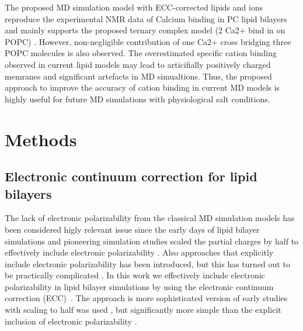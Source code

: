 \documentclass[aip,jcp,twocolumn]{revtex4}
\begin{document}

The proposed MD simulation model with ECC-corrected lipids and ions
reproduce the experimental NMR data of Calcium binding in PC lipid bilayers
and mainly supports the proposed ternary complex model (2 Ca2+ bind in
on POPC) \cite{akutsu81,altenbach84}. However, non-negligible contribution
of one Ca2+ cross bridging three POPC molecules is also observed.
The overestimated specific cation binding observed in current lipid models \cite{catte16}
may lead to articifially positively charged memranes and significant artefacts in
MD simualtions. Thus, the proposed approach to improve the accuracy of cation
binding in current MD models is highly useful for future MD simulations
with physiological salt conditions.




\section{Methods}

\subsection{Electronic continuum correction for lipid bilayers}
The lack of electronic polarizability from the classical MD simulation
models has been considered higly relevant issue since the early days of
lipid bilayer simulations and pioneering simulation studies scaled
the partial charges by half to effectively include electronic
polarizability \cite{jonsson86,egberts94}. Also approaches that
explicitly include electronic polarizability has been introduced, but
this has turned out to be practically complicated \cite{chowdhary13}.
In this work we effectively include electronic polarizability in lipid
bilayer simulations by using the electronic continuum correction
(ECC)~\cite{leontyev11}. The approach is more sophisticated version of
early studies with scaling to half was used \cite{jonsson86,egberts94},
but significantly more simple than the explicit inclusion of electronic
polarizability \cite{chowdhary13}.
\end{document}
